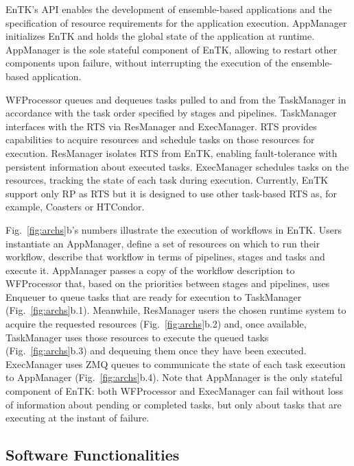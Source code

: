 \documentclass[preprint,12pt, a4paper]{elsarticle}
\begin{document}
EnTK's API enables the development of ensemble-based applications
and the specification of resource requirements for the application execution.
AppManager initializes EnTK and holds the global state of the application at
runtime. AppManager is the sole stateful component of EnTK, allowing to restart
other components upon failure, without interrupting the execution of the
ensemble-based application.

WFProcessor queues and dequeues tasks pulled to and from the TaskManager in
accordance with the task order specified by stages and pipelines. TaskManager
interfaces with the RTS via ResManager and ExecManager. RTS provides
capabilities to acquire resources and schedule tasks on those resources for
execution. ResManager isolates RTS from EnTK, enabling fault-tolerance with
persistent information about executed tasks. ExecManager schedules tasks on
the resources, tracking the state of each task during execution. Currently,
EnTK support only RP as RTS but it is designed to use other task-based RTS
as, for example, Coasters or HTCondor.

Fig.~\ref{fig:archs}b's numbers illustrate the execution of workflows in
EnTK\@. Users instantiate an AppManager, %
define a set of resources on which to run their workflow,
describe that workflow in terms of pipelines, stages and tasks
and execute it.
AppManager passes a copy of the workflow description to WFProcessor that, based
on the priorities between stages and pipelines, uses Enqueuer to queue tasks
that are ready for execution to TaskManager (Fig.~\ref{fig:archs}b.1).
Meanwhile, ResManager users the chosen runtime system to acquire the requested
resources (Fig.~\ref{fig:archs}b.2) and, once available, TaskManager uses those
resources to execute the queued tasks (Fig.~\ref{fig:archs}b.3) and dequeuing
them once they have been executed. ExecManager uses ZMQ queues to communicate
the state of each task execution to AppManager (Fig.~\ref{fig:archs}b.4). Note
that AppManager is the only stateful component of EnTK\@: both WFProcessor and
ExecManager can fail without loss of information about pending or completed
tasks, but only about tasks that are executing at the instant of failure.

\subsection{Software Functionalities}\label{ssec:functionalities}
\end{document}
